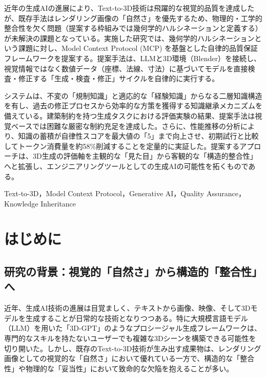 \documentclass[dvipdfmx, a4paper, 9pt]{deimj}
\begin{document}
\pagestyle{empty}

\begin{jabstract}
近年の生成AIの進展により、Text-to-3D技術は飛躍的な視覚的品質を達成したが、既存手法はレンダリング画像の「自然さ」を優先するため、物理的・工学的整合性を欠く問題（提案する枠組みでは幾何学的ハルシネーションと定義する）が未解決の課題となっている。実施した研究では、幾何学的ハルシネーションという課題に対し、Model Context Protocol (MCP) を基盤とした自律的品質保証フレームワークを提案する。提案手法は、LLMと3D環境（Blender）を接続し、視覚情報ではなく数値データ（座標、法線、寸法）に基づいてモデルを直接検査・修正する「生成・検査・修正」サイクルを自律的に実行する。

システムは、不変の「規制知識」と適応的な「経験知識」からなる二層知識構造を有し、過去の修正プロセスから効率的な方策を獲得する知識継承メカニズムを備えている。建築制約を持つ生成タスクにおける評価実験の結果、提案手法は視覚ベースでは困難な厳密な制約充足を達成した。さらに、性能推移の分析により、知識の蓄積が自律性スコアを最大値の「5」まで向上させ、初期試行と比較してトークン消費量を約58\%削減することを定量的に実証した。提案するアプローチは、3D生成の評価軸を主観的な「見た目」から客観的な「構造的整合性」へと拡張し、エンジニアリングツールとしての生成AIの可能性を拓くものである。
\end{jabstract}

\begin{jkeyword}
Text-to-3D，Model Context Protocol，Generative AI，Quality Assurance，Knowledge Inheritance
\end{jkeyword}

\maketitle

\section{はじめに}

\subsection{研究の背景：視覚的「自然さ」から構造的「整合性」へ}

近年、生成AI技術の進展は目覚ましく、テキストから画像、映像、そして3Dモデルを生成することが日常的な技術となりつつある。特に大規模言語モデル（LLM）を用いた「3D-GPT」\cite{sun20233dgpt}のようなプロシージャル生成フレームワークは、専門的なスキルを持たないユーザーでも複雑な3Dシーンを構築できる可能性を切り開いた。しかし、既存のText-to-3D技術が生み出す成果物は、レンダリング画像としての視覚的な「自然さ」において優れている一方で、構造的な「整合性」や物理的な「妥当性」において致命的な欠陥を抱えることが多い。
\end{document}
